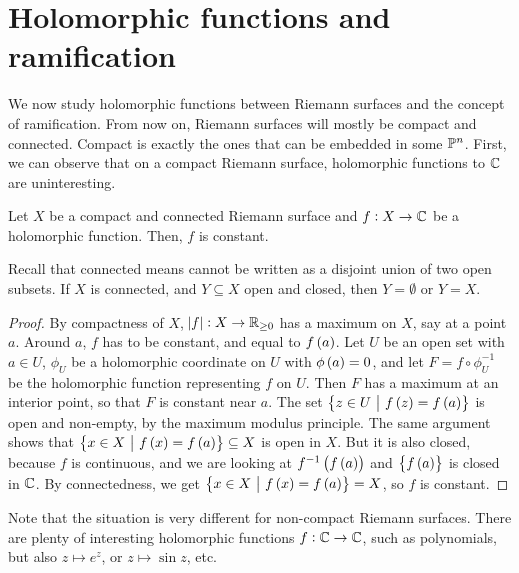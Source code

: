 \pagebreak

\section{Holomorphic functions and ramification}


We now study holomorphic functions between Riemann surfaces and the concept of ramification. From now on, Riemann surfaces will mostly be compact and connected. Compact is exactly the ones that can be embedded in some $ \mathbb{P}^n $. First, we can observe that on a compact Riemann surface, holomorphic functions to $ \mathbb{C} $ are uninteresting.

\begin{proposition}
Let $ X $ be a compact and connected Riemann surface and $ f : X \to \mathbb{C} $ be a holomorphic function. Then, $ f $ is constant.
\end{proposition}

Recall that connected means cannot be written as a disjoint union of two open subsets. If $ X $ is connected, and $ Y \subseteq X $ open and closed, then $ Y = \emptyset $ or $ Y = X $.

\begin{proof}
By compactness of $ X $, $ \abs{f} : X \to \mathbb{R}_{\ge 0} $ has a maximum on $ X $, say at a point $ a $. Around $ a $, $ f $ has to be constant, and equal to $ f\br{a} $. Let $ U $ be an open set with $ a \in U $, $ \phi_U $ be a holomorphic coordinate on $ U $ with $ \phi\br{a} = 0 $, and let $ F = f \circ \phi_U^{-1} $ be the holomorphic function representing $ f $ on $ U $. Then $ F $ has a maximum at an interior point, so that $ F $ is constant near $ a $. The set $ \cbr{z \in U \st f\br{z} = f\br{a}} $ is open and non-empty, by the maximum modulus principle. The same argument shows that $ \cbr{x \in X \st f\br{x} = f\br{a}} \subseteq X $ is open in $ X $. But it is also closed, because $ f $ is continuous, and we are looking at $ f^{-1}\br{f\br{a}} $ and $ \cbr{f\br{a}} $ is closed in $ \mathbb{C} $. By connectedness, we get $ \cbr{x \in X \st f\br{x} = f\br{a}} = X $, so $ f $ is constant.
\end{proof}

\begin{remark}
Note that the situation is very different for non-compact Riemann surfaces. There are plenty of interesting holomorphic functions $ f : \mathbb{C} \to \mathbb{C} $, such as polynomials, but also $ z \mapsto e^z $, or $ z \mapsto \sin z $, etc.
\end{remark}

